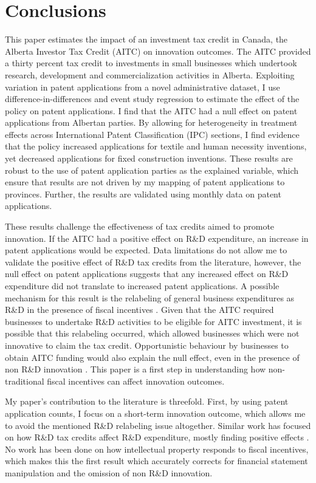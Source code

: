 \documentclass[../main.tex]{subfiles}
\begin{document}
\section{Conclusions}
\label{sec:conclusions}

This paper estimates the impact of an investment tax credit in Canada, the Alberta Investor Tax Credit (AITC) on innovation outcomes. The AITC provided a thirty percent tax credit to investments in small businesses which undertook research, development and commercialization activities in Alberta. Exploiting variation in patent applications from a novel administrative dataset, I use difference-in-differences and event study regression to estimate the effect of the policy on patent applications. I find that the AITC had a null effect on patent applications from Albertan parties. By allowing for heterogeneity in treatment effects across International Patent Classification (IPC) sections, I find evidence that the policy increased applications for textile and human necessity inventions, yet decreased applications for fixed construction inventions. These results are robust to the use of patent application parties as the explained variable, which ensure that results are not driven by my mapping of patent applications to provinces. Further, the results are validated using monthly data on patent applications. 

These results challenge the effectiveness of tax credits aimed to promote innovation. If the AITC had a positive effect on R\&D expenditure, an increase in patent applications would be expected. Data limitations do not allow me to validate the positive effect of R\&D tax credits from the literature, however, the null effect on patent applications suggests that any increased effect on R\&D expenditure did not translate to increased patent applications. A possible mechanism for this result is the relabeling of general business expenditures as R\&D in the presence of fiscal incentives \parencite{chen_etal21}. Given that the AITC required businesses to undertake R\&D activities to be eligible for AITC investment, it is possible that this relabeling occurred, which allowed businesses which were not innovative to claim the tax credit. Opportunistic behaviour by businesses to obtain AITC funding would also explain the null effect, even in the presence of non R\&D innovation \parencite{xie_etal19}. This paper is a first step in understanding how non-traditional fiscal incentives can affect innovation outcomes. 

My paper's contribution to the literature is threefold. First, by using patent application counts, I focus on a short-term innovation outcome, which allows me to avoid the mentioned R\&D relabeling issue altogether. Similar work has focused on how R\&D tax credits affect R\&D expenditure, mostly finding positive effects \parencite{guceri18,rao16,guceri_liu19,becker15}. No work has been done on how intellectual property responds to fiscal incentives, which makes this the first result which accurately corrects for financial statement manipulation and the omission of non R\&D innovation.
\end{document}
